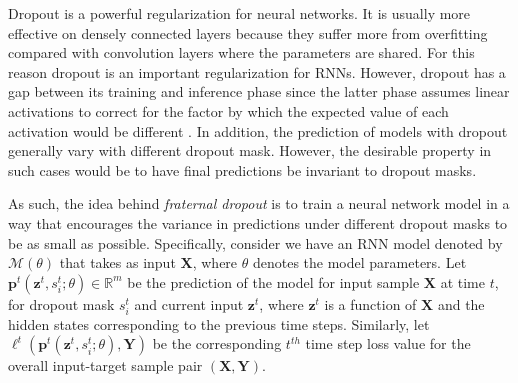 \documentclass{article} \usepackage{iclr2018_conference,times}
\begin{document}
Dropout is a powerful regularization for neural networks. It is usually more effective on densely connected layers because they suffer more from overfitting compared with convolution layers where the parameters are shared. For this reason dropout is an important regularization for RNNs. However, dropout has a gap between its training and inference phase since the latter phase assumes linear activations to correct for the factor by which the expected value of each activation would be different \cite{ma2016dropout}. In addition, the prediction of models with dropout generally vary with different dropout mask. However, the desirable property in such cases would be to have final predictions be invariant to dropout masks.

As such, the idea behind \emph{fraternal dropout} is to train a neural network model in a way that encourages the variance in predictions under different dropout masks to be as small as possible. Specifically, consider we have an RNN model denoted by $\mathcal{M}(\theta)$ that takes as input $\mathbf{X}$, where $\theta$ denotes the model parameters. Let $\mathbf{p}^t(\mathbf{z}^t, s_i^t; \theta) \in \mathbb{R}^m$ be the prediction of the model for input sample $\mathbf{X}$ at time $t$, for dropout mask $s_i^t$ and current input $\mathbf{z}^t$, where $\mathbf{z}^t$ is a function of $\mathbf{X}$ and the hidden states corresponding to the previous time steps. Similarly, let $\ell^t(\mathbf{p}^t(\mathbf{z}^{t}, s_i^t; \theta),\mathbf{Y})$ be the corresponding $t^{th}$ time step loss value for the overall input-target sample pair $(\mathbf{X}, \mathbf{Y})$.
\end{document}
